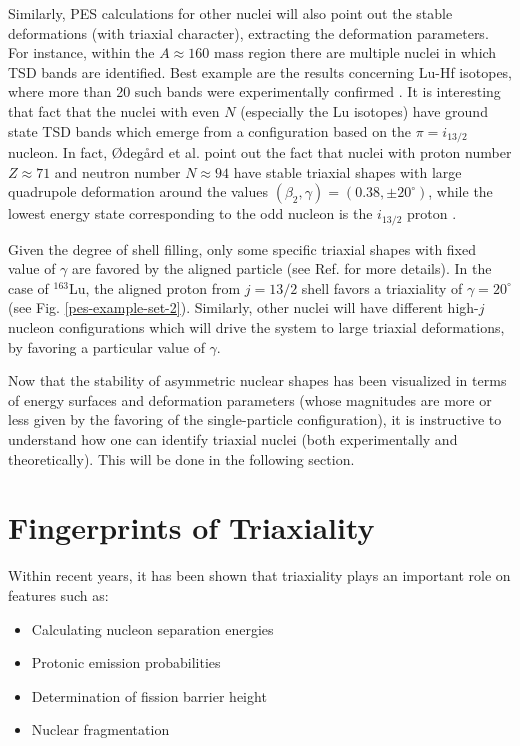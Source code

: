 Similarly, PES calculations for other nuclei will also point out the stable deformations (with triaxial character), extracting the deformation parameters. For instance, within the $A\approx160$ mass region there are multiple nuclei in which TSD bands are identified. Best example are the results concerning Lu-Hf isotopes, where more than 20 such bands were experimentally confirmed \cite{gu2007theoretical}. It is interesting that fact that the nuclei with even $N$ (especially the Lu isotopes) have ground state TSD bands which emerge from a configuration based on the $\pi=i_{13/2}$ nucleon. In fact, Ødegård et al. \cite{odegaard2001evidence} point out the fact that nuclei with proton number $Z\approx 71$ and neutron number $N\approx 94$ have stable triaxial shapes with large quadrupole deformation around the values $(\beta_2,\gamma)=(0.38,\pm 20^\circ)$, while the lowest energy state corresponding to the odd nucleon is the $i_{13/2}$ proton \cite{schnack1995superdeformed}.

Given the degree of shell filling, only some specific triaxial shapes with fixed value of $\gamma$ are favored by the aligned particle (see Ref. \cite{hamamoto1983intrinsic} for more details). In the case of $^{163}$Lu, the aligned proton from $j=13/2$ shell favors a triaxiality of $\gamma=20^\circ$ (see Fig. \ref{pes-example-set-2}). Similarly, other nuclei will have different high-$j$ nucleon configurations which will drive the system to large triaxial deformations, by favoring a particular value of $\gamma$.

Now that the stability of asymmetric nuclear shapes has been visualized in terms of energy surfaces and deformation parameters (whose magnitudes are more or less given by the favoring of the single-particle configuration), it is instructive to understand how one can identify triaxial nuclei (both experimentally and theoretically). This will be done in the following section.

\section{Fingerprints of Triaxiality}

Within recent years, it has been shown that triaxiality plays an important role on features such as:
\begin{itemize}
    \item Calculating nucleon separation energies \cite{moller2006global}
    \item Protonic emission probabilities \cite{qi2019recent,budaca2022deformation}
    \item Determination of fission barrier height \cite{moller2009heavy,lu2012potential}
    \item Nuclear fragmentation \cite{palumbo1985splitting}
\end{itemize}

